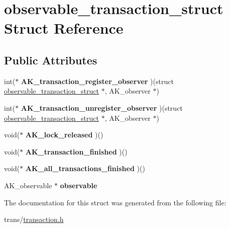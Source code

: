 \hypertarget{structobservable__transaction__struct}{}\section{observable\+\_\+transaction\+\_\+struct Struct Reference}
\label{structobservable__transaction__struct}
\subsection*{Public Attributes}
\begin{DoxyCompactItemize}
\item 
int($\ast$ {\bfseries A\+K\+\_\+transaction\+\_\+register\+\_\+observer} )(struct \hyperlink{structobservable__transaction__struct}{observable\+\_\+transaction\+\_\+struct} $\ast$, A\+K\+\_\+observer $\ast$)\hypertarget{structobservable__transaction__struct_a55a99c7c17b86bed699c92ccd376e74c}{}\label{structobservable__transaction__struct_a55a99c7c17b86bed699c92ccd376e74c}

\item 
int($\ast$ {\bfseries A\+K\+\_\+transaction\+\_\+unregister\+\_\+observer} )(struct \hyperlink{structobservable__transaction__struct}{observable\+\_\+transaction\+\_\+struct} $\ast$, A\+K\+\_\+observer $\ast$)\hypertarget{structobservable__transaction__struct_a75e49bf7dd46c0c18b7e157fd277eab3}{}\label{structobservable__transaction__struct_a75e49bf7dd46c0c18b7e157fd277eab3}

\item 
void($\ast$ {\bfseries A\+K\+\_\+lock\+\_\+released} )()\hypertarget{structobservable__transaction__struct_a3674428ce2071802257887f7a479c610}{}\label{structobservable__transaction__struct_a3674428ce2071802257887f7a479c610}

\item 
void($\ast$ {\bfseries A\+K\+\_\+transaction\+\_\+finished} )()\hypertarget{structobservable__transaction__struct_a63d5a61f54891e6f0cfe79124fd84dd4}{}\label{structobservable__transaction__struct_a63d5a61f54891e6f0cfe79124fd84dd4}

\item 
void($\ast$ {\bfseries A\+K\+\_\+all\+\_\+transactions\+\_\+finished} )()\hypertarget{structobservable__transaction__struct_af16a498f9091c7b08173c8dceaf30b3c}{}\label{structobservable__transaction__struct_af16a498f9091c7b08173c8dceaf30b3c}

\item 
A\+K\+\_\+observable $\ast$ {\bfseries observable}\hypertarget{structobservable__transaction__struct_ac03a8590cbe1010bef9153196eaaba82}{}\label{structobservable__transaction__struct_ac03a8590cbe1010bef9153196eaaba82}

\end{DoxyCompactItemize}


The documentation for this struct was generated from the following file\+:\begin{DoxyCompactItemize}
\item 
trans/\hyperlink{transaction_8h}{transaction.\+h}\end{DoxyCompactItemize}
